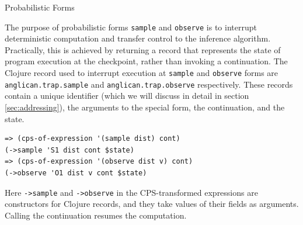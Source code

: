 \documentclass[sigconf]{acmart}
\begin{document}
\iftoggle{full}{%

}{%
}%

\iftoggle{full}{%
\subsection{Implementation Highlights}
\label{seq:highlights}

So far we introduced the basics of Anglican compilation to
Clojure. The described approaches and techniques are important
for grasping the language implementation but relatively well-known.
In the rest of the section we focus on challenges we met and
resolved while implementing Anglican, as well as on
implementation of unique features of Anglican as a probabilistic
programming language.
}{%
}%

\iftoggle{full}{\subsubsection}{\subsection}{Probabilistic Forms}
\label{seq:forms}

The purpose of probabilistic forms \texttt{sample} and
\texttt{observe} is to interrupt deterministic computation and
transfer control to the inference algorithm.  Practically, this
is achieved by returning a record that represents the state of program execution at the checkpoint, rather than invoking a continuation. The Clojure record used to interrupt execution at 
\texttt{sample} and \texttt{observe} forms are \texttt{anglican.{\linebreak[0]}trap.{\linebreak[0]}sample} and \texttt{anglican.{\linebreak[0]}trap.{\linebreak[0]}observe} respectively. These records contain a unique identifier (which we will discuss in detail in section \ref{sec:addressing}), the arguments to the special form, the continuation, and the state.
\begin{lstlisting}[style=default]
=> (cps-of-expression '(sample dist) cont)
(->sample 'S1 dist cont $state)
=> (cps-of-expression '(observe dist v) cont)
(->observe 'O1 dist v cont $state)
\end{lstlisting}
Here \texttt{->sample} and \texttt{->observe} in the
CPS-transformed expressions are constructors for Clojure
records, and they take values of their fields as arguments.
Calling the continuation resumes the computation.
\end{document}
